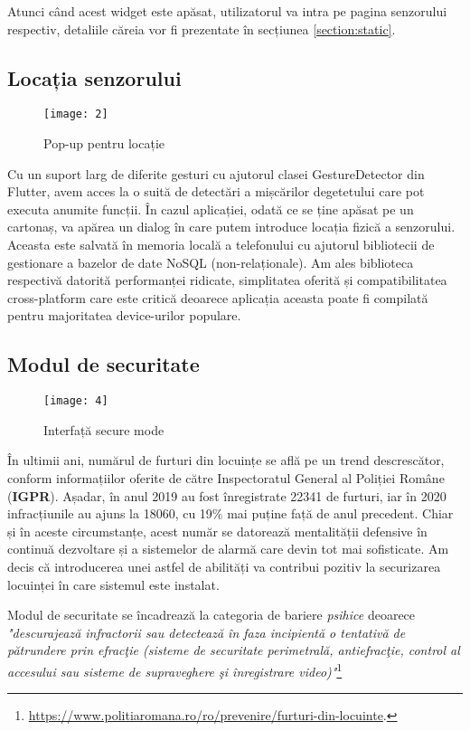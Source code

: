 Atunci când acest widget este apăsat, utilizatorul va intra pe pagina senzorului respectiv, detaliile căreia vor fi prezentate în secțiunea \ref{section:static}.

\subsection{Locația senzorului}

\begin{wrapfigure}{r}{0.4\textwidth}
	\texttt{[image: 2]}
	\caption{Pop-up pentru locație}
	\label{fig:2}
\end{wrapfigure}
Cu un suport larg de diferite gesturi cu ajutorul clasei GestureDetector din Flutter, avem acces la o suită de detectări a mișcărilor degetetului care pot executa anumite funcții. În cazul aplicației, odată ce se ține apăsat pe un cartonaș, va apărea un dialog în care putem introduce locația fizică a senzorului.
\hfill
Aceasta este salvată în memoria locală a telefonului cu ajutorul bibliotecii de gestionare a bazelor de date NoSQL (non-relaționale). Am ales biblioteca respectivă datorită performanței ridicate, simplitatea oferită și compatibilitatea cross-platform care este critică deoarece aplicația aceasta poate fi compilată pentru majoritatea device-urilor populare. 
\break

\subsection{Modul de securitate} 
\label{section:securitate}

\begin{wrapfigure}{r}{0.4\textwidth}
	\texttt{[image: 4]}
	\caption{Interfață secure mode}
	\label{fig:4}
\end{wrapfigure}

În ultimii ani, numărul de furturi din locuințe se află pe un trend descrescător, conform informațiilor oferite de către Inspectoratul General al Poliției Române (\textbf{IGPR}). Așadar, în anul 2019 au fost înregistrate 22341 de furturi, iar în 2020 infracțiunile au ajuns la 18060, cu 19\% mai puține față de anul precedent. Chiar și în aceste circumstanțe, acest număr se datorează mentalității defensive în continuă dezvoltare și a sistemelor de alarmă care devin tot mai sofisticate. Am decis că introducerea unei astfel de abilități va contribui pozitiv la securizarea locuinței în care sistemul este instalat.

Modul de securitate se încadrează la categoria de bariere \emph{psihice} deoarece \emph{"descurajează infractorii sau detectează în faza incipientă o tentativă de pătrundere prin efracţie (sisteme de securitate perimetrală, antiefracţie, control al accesului sau sisteme de supraveghere şi înregistrare video)"}\footnote{\url{https://www.politiaromana.ro/ro/prevenire/furturi-din-locuinte}.}

